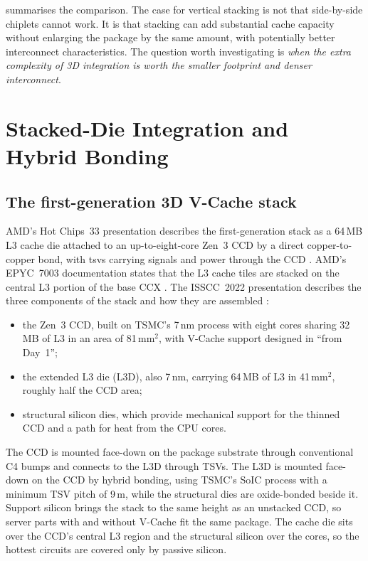  summarises the comparison. The case for vertical stacking is not that side-by-side chiplets cannot work. It is that stacking can add substantial cache capacity without enlarging the package by the same amount, with potentially better interconnect characteristics. The question worth investigating is \emph{when the extra complexity of 3D integration is worth the smaller footprint and denser interconnect}.

\section{Stacked-Die Integration and Hybrid Bonding}
\label{sec:hybrid-bonding}

\subsection{The first-generation 3D V-Cache stack}
AMD's Hot Chips~33 presentation describes the first-generation stack as a 64\,MB L3 cache die attached to an up-to-eight-core Zen~3 CCD by a direct copper-to-copper bond, with \glspl{tsv} carrying signals and power through the CCD \cite{swaminathanAdvancedPackagingEnabling2021}. AMD's EPYC~7003 documentation states that the L3 cache tiles are stacked on the central L3 portion of the base CCX \cite{amd2022epyc7003}. The ISSCC~2022 presentation describes the three components of the stack and how they are assembled \cite[slides~10--12, 14, 16--17]{wuu2022vcache}:
\begin{itemize}
  \item the Zen~3 CCD, built on TSMC's 7\,nm process with eight cores sharing 32\,MB of L3 in an area of 81\,mm$^2$, with V-Cache support designed in ``from Day~1'';
  \item the extended L3 die (L3D), also 7\,nm, carrying 64\,MB of L3 in 41\,mm$^2$, roughly half the CCD area;
  \item structural silicon dies, which provide mechanical support for the thinned CCD and a path for heat from the CPU cores.
\end{itemize}
The CCD is mounted face-down on the package substrate through conventional C4 bumps and connects to the L3D through TSVs. The L3D is mounted face-down on the CCD by hybrid bonding, using TSMC's SoIC process with a minimum TSV pitch of 9\,\textmu m, while the structural dies are oxide-bonded beside it. Support silicon brings the stack to the same height as an unstacked CCD, so server parts with and without V-Cache fit the same package. The cache die sits over the CCD's central L3 region \cite{amd2022epyc7003} and the structural silicon over the cores, so the hottest circuits are covered only by passive silicon.


